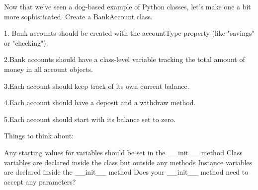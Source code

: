 Now that we've seen a dog-based example 
of Python classes, 
let's make one a bit more sophisticated. 
Create a BankAccount class.

1. Bank accounts should be created with the 
accountType property (like "savings" or 
"checking").

2.Bank accounts should have a class-level 
variable tracking the total amount of 
money in all account objects.

3.Each account should keep track of its own 
current balance.

4.Each account should have a deposit 
and a withdraw method.

5.Each account should start with its 
balance set to zero.


Things to think about:

Any starting values for variables should be set in the __init__ method
Class variables are declared inside the class but outside any methods
Instance variables are declared inside the __init__ method
Does your __init__ method need to accept any parameters?